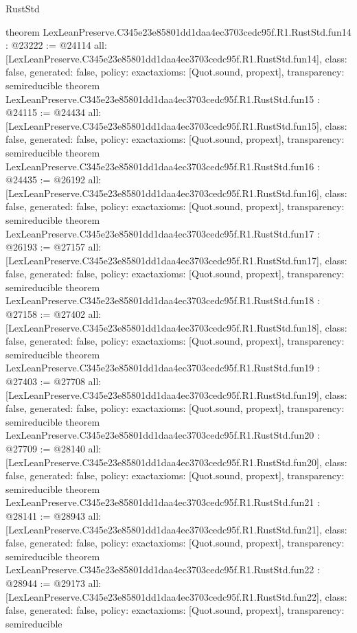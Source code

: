 \begin{lexlean}{RustStd}
\begin{coremodule}
{}
theorem LexLeanPreserve.C345e23e85801dd1daa4ec3703cedc95f.R1.RustStd.fun14 : @23222 := @24114 {
  all: [LexLeanPreserve.C345e23e85801dd1daa4ec3703cedc95f.R1.RustStd.fun14],
  class: false,
  generated: false,
  policy: exact{axioms: [Quot.sound, propext]},
  transparency: semireducible
}
theorem LexLeanPreserve.C345e23e85801dd1daa4ec3703cedc95f.R1.RustStd.fun15 : @24115 := @24434 {
  all: [LexLeanPreserve.C345e23e85801dd1daa4ec3703cedc95f.R1.RustStd.fun15],
  class: false,
  generated: false,
  policy: exact{axioms: [Quot.sound, propext]},
  transparency: semireducible
}
theorem LexLeanPreserve.C345e23e85801dd1daa4ec3703cedc95f.R1.RustStd.fun16 : @24435 := @26192 {
  all: [LexLeanPreserve.C345e23e85801dd1daa4ec3703cedc95f.R1.RustStd.fun16],
  class: false,
  generated: false,
  policy: exact{axioms: [Quot.sound, propext]},
  transparency: semireducible
}
theorem LexLeanPreserve.C345e23e85801dd1daa4ec3703cedc95f.R1.RustStd.fun17 : @26193 := @27157 {
  all: [LexLeanPreserve.C345e23e85801dd1daa4ec3703cedc95f.R1.RustStd.fun17],
  class: false,
  generated: false,
  policy: exact{axioms: [Quot.sound, propext]},
  transparency: semireducible
}
theorem LexLeanPreserve.C345e23e85801dd1daa4ec3703cedc95f.R1.RustStd.fun18 : @27158 := @27402 {
  all: [LexLeanPreserve.C345e23e85801dd1daa4ec3703cedc95f.R1.RustStd.fun18],
  class: false,
  generated: false,
  policy: exact{axioms: [Quot.sound, propext]},
  transparency: semireducible
}
theorem LexLeanPreserve.C345e23e85801dd1daa4ec3703cedc95f.R1.RustStd.fun19 : @27403 := @27708 {
  all: [LexLeanPreserve.C345e23e85801dd1daa4ec3703cedc95f.R1.RustStd.fun19],
  class: false,
  generated: false,
  policy: exact{axioms: [Quot.sound, propext]},
  transparency: semireducible
}
theorem LexLeanPreserve.C345e23e85801dd1daa4ec3703cedc95f.R1.RustStd.fun20 : @27709 := @28140 {
  all: [LexLeanPreserve.C345e23e85801dd1daa4ec3703cedc95f.R1.RustStd.fun20],
  class: false,
  generated: false,
  policy: exact{axioms: [Quot.sound, propext]},
  transparency: semireducible
}
theorem LexLeanPreserve.C345e23e85801dd1daa4ec3703cedc95f.R1.RustStd.fun21 : @28141 := @28943 {
  all: [LexLeanPreserve.C345e23e85801dd1daa4ec3703cedc95f.R1.RustStd.fun21],
  class: false,
  generated: false,
  policy: exact{axioms: [Quot.sound, propext]},
  transparency: semireducible
}
theorem LexLeanPreserve.C345e23e85801dd1daa4ec3703cedc95f.R1.RustStd.fun22 : @28944 := @29173 {
  all: [LexLeanPreserve.C345e23e85801dd1daa4ec3703cedc95f.R1.RustStd.fun22],
  class: false,
  generated: false,
  policy: exact{axioms: [Quot.sound, propext]},
  transparency: semireducible
}
\end{coremodule}
\end{lexlean}
